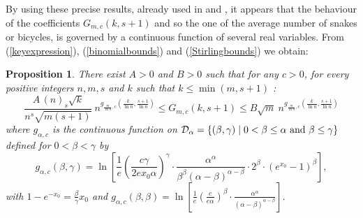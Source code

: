 \documentclass[aop,noinfoline]{imsart}
\newtheorem{proposition}[theorem]{Proposition}
\begin{document}
By using these precise results, already used in \cite{DuboisB-97} and \cite{CreignouDE-07},  it appears that the behaviour of the coefficients $G_{m,c}(k,s+1)$ and so the one of the average number of snakes or bicycles, is  governed by a continuous function of several real variables. From (\ref{keyexpression}), (\ref{binomialbounds}) and (\ref{Stirlingbounds})  we obtain: 
\begin{proposition}\label{thebig} There exist $A>0$ and $B>0$ such that   for any  $c>0$, for every positive  integers $n, m, s$ and $k$ such that   $k \le \min(m,s+1)$  :  
  \begin{equation}\label{minMaj}
 \frac{A\, (n)_s\sqrt{k}}{ n^s\sqrt{m (s+1)}}\  n^{g_{\frac{m}{\ln n},c}(\frac{k}{\ln n},\frac{s+1}{\ln n})}\le G_{m,c}(k,s+1)\leq B \sqrt{m}\  n^{g_{\frac{m}{\ln n},c}(\frac{k}{\ln n},\frac{s+1}{\ln n})}
 \end{equation}
 where $g_{\alpha,c}$ is the continuous  function  on  $\mathcal{D}_{\alpha}= \{ (\beta,
 \gamma) \mid 0< \beta \le \alpha  \hbox { and } \beta \le \gamma\}$ defined for $0<\beta < \gamma$ by
 \begin{equation}\label{eqn:def-of-g}
   g_{\alpha,c}(\beta, \gamma)=\ln \left\lbrack\frac{1}{e}\left (
    \frac{c\gamma}{2ex_0\alpha}\right ) ^\gamma\cdot
  \frac{\alpha^\alpha}{\beta ^\beta(\alpha-\beta)^{\alpha-\beta}}
  \cdot 2^\beta\cdot (e^{x_0}-1)^\beta\right\rbrack,
\end{equation}
 with $\displaystyle 1-e^{-x_0}=\frac{\beta}{\gamma}x_0$ and  $ \displaystyle g_{\alpha,c}(\beta, \beta) = \ln \left\lbrack\frac{1}{e}\left (
    \frac{c}{e\alpha}\right ) ^\beta\cdot
  \frac{\alpha^\alpha}{(\alpha-\beta)^{\alpha-\beta}}
  \right\rbrack.$
  \end{proposition}
\end{document}
